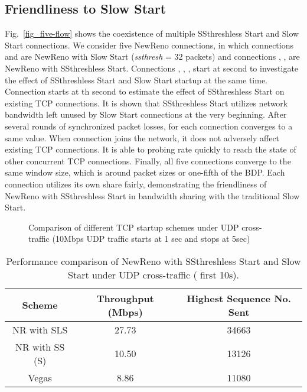 \documentclass[12pt,onecolumn]{IEEEtran}
\begin{document}
\subsection{Friendliness to Slow Start}

Fig.~\ref{fig_five-flow} shows the coexistence of multiple SSthreshless Start
and Slow Start connections. We consider five NewReno connections, in which
connections  and  are NewReno with Slow Start (\emph{ssthresh} = 32
packets) and connections , ,  are NewReno with SSthreshless Start.
Connections , , ,  start at  second to investigate the effect of
SSthreshless Start and Slow Start startup at the same time. Connection 
starts at th second to estimate the effect of SSthreshless Start on
existing TCP connections. It is shown that SSthreshless Start utilizes network
bandwidth left unused by Slow Start connections at the very beginning. After
several rounds of synchronized packet losses,  for each connection
converges to a same value. When connection  joins the network, it does not
adversely affect existing TCP connections. It is able to probing rate quickly to
reach the state of other concurrent TCP connections. Finally, all five
connections converge to the same window size, which is around  packet
sizes or one-fifth of the BDP. Each connection utilizes its own share fairly,
demonstrating the friendliness of NewReno with SSthreshless Start in bandwidth
sharing with the traditional Slow Start.

\begin{figure}
 \centering
  \centering
  \caption{Comparison of different TCP startup schemes under UDP cross-traffic (10Mbps UDP traffic starts at 1 sec and stops at 5sec)}
\label{fig_UDP}
\end{figure}
\begin{table}[h]
\centering
\label{table5}\caption{\footnotesize Performance comparison of NewReno with SSthreshless Start and Slow Start under UDP cross-traffic ( first 10s).}
\begin{tabular}{|c|c|c|} \hline
Scheme & Throughput (Mbps) & Highest Sequence No. Sent\\ \hline \hline
NR with SLS & 27.73   &  34663 \\ \hline NR with SS (S)  & 10.50  & 13126  \\ \hline
Vegas  & 8.86  & 11080  \\ \hline \end{tabular}
\end{table}
\end{document}
